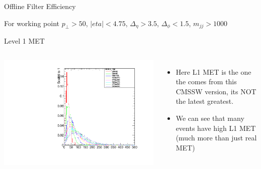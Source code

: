 \documentclass[8pt]{beamer}
\begin{document}
\begin{frame}{Offline Filter Efficiency}

For working point $p_\perp>50$, $|eta|<4.75$, $\Delta_{\eta}>3.5$, $\Delta_{\phi}<1.5$, $m_{jj}>1000$

\begin{block}{Level 1 MET}

\begin{columns}


  \centering
  \includegraphics[width=0.8\linewidth]{img/L1Extra_MET.pdf}


\begin{itemize}
  \item Here L1 MET is the one the comes from this CMSSW version, its NOT the latest greatest.
  \item We can see that many events have high L1 MET (much more than just real MET)
\end{itemize}

\end{columns}
  
\end{block}


\end{frame}
\end{document}
